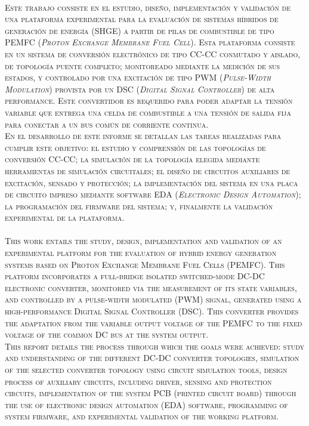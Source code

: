 \normalfont\huge
\scshape\color{AzulFI_dark}
\\

\normalfont\normalsize\normalcolor
Este trabajo consiste en el estudio, diseño, implementación y validación de una plataforma experimental para la evaluación de sistemas híbridos de generación de energía (SHGE) a partir de pilas de combustible de tipo PEMFC (\textit{Proton Exchange Membrane Fuel Cell}). Esta plataforma consiste en un sistema de conversión electrónico de tipo CC-CC conmutado y aislado, de topología puente completo; monitoreado mediante la medición de sus estados, y controlado por una excitación de tipo PWM (\textit{Pulse-Width Modulation}) provista por un DSC (\textit{Digital Signal Controller}) de alta performance. Este convertidor es requerido para poder adaptar la tensión variable que entrega una celda de combustible a una tensión de salida fija para conectar a un bus común de corriente continua.\\

En el desarrollo de este informe se detallan las tareas realizadas para cumplir este objetivo: el estudio y comprensión de las topologías de conversión CC-CC; la simulación de la topología elegida mediante herramientas de simulación circuitales; el diseño de circuitos auxiliares de excitación, sensado y protección; la implementación del sistema en una placa de circuito impreso mediante software EDA (\textit{Electronic Design Automation}); la programación del firmware del sistema; y, finalmente la validación experimental de la plataforma.\\

\vspace{1cm}
\huge
\scshape\color{AzulFI_dark}
\\

\normalsize\normalfont\normalcolor
This work entails the study, design, implementation and validation of an experimental platform for the evaluation of hybrid energy generation systems based on Proton Exchange Membrane Fuel Cells (PEMFC). This platform incorporates a full-bridge isolated switched-mode DC-DC electronic converter, monitored via the measurement of its state variables, and controlled by a pulse-width modulated (PWM) signal, generated using a high-performance Digital Signal Controller (DSC). This converter provides the adaptation from the variable output voltage of the PEMFC to the fixed voltage of the common DC bus at the system output.\\

This report details the process through which the goals were achieved: study and understanding of the different DC-DC converter topologies, simulation of the selected converter topology using circuit simulation tools, design process of auxiliary circuits, including driver, sensing and protection circuits,  implementation of the system PCB (printed circuit board) through the use of electronic design automation (EDA) software, programming of system firmware, and experimental validation of the working platform.\\ 
